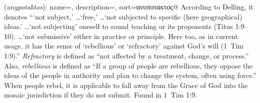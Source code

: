 \item[Rebellious,]

(\textit{anypotaktos}):
{
    name=,
    description={},
    sort=ανυποτακτος@
}
According to Delling, it denotes ```not subject,' \ldots `free,' \ldots `not subjected to specific (here geographical) ideas.' \ldots `not subjecting' oneself to sound teaching or its proponents (Titus 1:9--10). \ldots`not submissive' either in practice or principle. Here too, as in current usage, it has the sense of `rebellious' or `refractory' against God's will (1~Tim 1:9).''
\emph{Refractory} is defined as ``not affected by a treatment, change, or process.'' Also, \emph{rebellious} is defined as ``If a group of people are rebellious, they oppose the ideas of the people in authority and plan to change the system, often using force.'' When people rebel, it is applicable to fall away from the Grace of God into the mosaic jurisdiction if they do not submit.
Found in 1~Tim 1:9.
